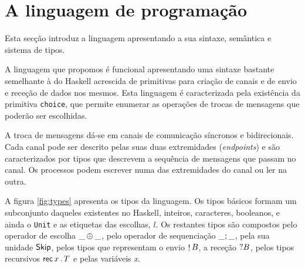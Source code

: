 \section{A linguagem de programação}

Esta secção introduz a linguagem apresentando a sua sintaxe, 
semântica e sistema de tipos. 

A linguagem que propomos é funcional apresentando uma sintaxe 
bastante semelhante à do Haskell acrescida de primitivas para 
criação de canais e de envio e receção de dados nos mesmos. 
Esta linguagem é caracterizada pela existência da
primitiva \lstinline|choice|, que permite
enumerar as operações de trocas de mensagens 
que poderão ser escolhidas.

A troca de mensagens dá-se em canais de comunicação síncronos e 
bidirecionais. Cada canal pode ser descrito pelas suas duas 
extremidades (\textit{endpoints}) e são caracterizados por tipos 
que descrevem a sequência de mensagens que passam no canal.
Os processos podem escrever numa das extremidades do canal ou ler na outra.



A figura \ref{fig:types} apresenta os tipos da linguagem.
Os tipos básicos formam um subconjunto daqueles existentes no Haskell, 
inteiros, caracteres, booleanos, e ainda o \lstinline"Unit" e as etiquetas
das escolhas, $l$.
Os restantes tipos são compostos pelo 
operador de escolha $\_ \oplus \_$,
pelo operador de sequenciação 
$\_;\_$, pela sua unidade $\mathsf{Skip}$, pelos tipos que representam o envio $\mathop! B$, 
a receção $?B$, 
pelos tipos recursivos $\mathsf{rec}\,x\,.\,T$ e pelas variáveis \textit{x}.
